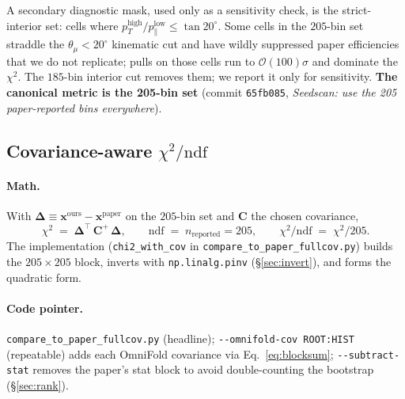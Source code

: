 \documentclass[12pt]{article}
\newcommand{\pT}{p_{T}}
\newcommand{\pPar}{p_{\parallel}}
\newcommand{\ours}{\text{ours}}
\newcommand{\paper}{\text{paper}}
\newcommand{\T}{^{\!\top}}
\begin{document}
A secondary diagnostic mask, used only as a sensitivity check, is the
strict-interior set: cells where $\pT^{\text{high}} / \pPar^{\text{low}}
\le \tan 20^{\circ}$. Some cells in the $205$-bin set straddle the
$\theta_{\mu}<20^{\circ}$ kinematic cut and have wildly suppressed
paper efficiencies that we do not replicate; pulls on those cells run
to $\mathcal{O}(100)\sigma$ and dominate the $\chi^{2}$. The $185$-bin
interior cut removes them; we report it only for sensitivity.
\textbf{The canonical metric is the 205-bin set} (commit \texttt{65fb085},
\textit{Seedscan: use the 205 paper-reported bins everywhere}).

\subsection{Covariance-aware $\chi^{2}/\mathrm{ndf}$}
\label{sec:chisq}

\paragraph{Math.}
With $\boldsymbol{\Delta}\equiv\mathbf{x}^{\ours}-\mathbf{x}^{\paper}$
on the $205$-bin set and $\mathbf{C}$ the chosen covariance,
\begin{equation}
\chi^{2}
\;=\;
\boldsymbol{\Delta}\T\,\mathbf{C}^{+}\,\boldsymbol{\Delta},
\qquad
\mathrm{ndf} \;=\; n_{\text{reported}} = 205,
\qquad
\chi^{2}/\mathrm{ndf} \;=\; \chi^{2}/205.
\end{equation}
The implementation (\texttt{chi2\_with\_cov} in
\texttt{compare\_to\_paper\_fullcov.py}) builds the $205\times205$
block, inverts with \texttt{np.linalg.pinv} (\S\ref{sec:invert}), and
forms the quadratic form.

\paragraph{Code pointer.}
\texttt{compare\_to\_paper\_fullcov.py} (headline);
\texttt{-{}-omnifold-cov ROOT:HIST} (repeatable) adds each OmniFold
covariance via Eq.~\eqref{eq:blocksum}; \texttt{-{}-subtract-stat}
removes the paper's stat block to avoid double-counting the bootstrap
(\S\ref{sec:rank}).
\end{document}
